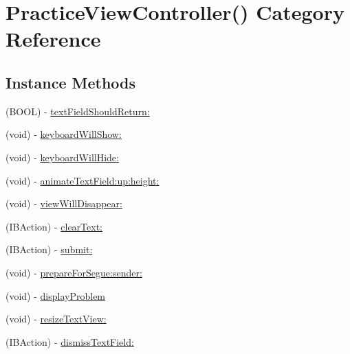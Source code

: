\hypertarget{category_practice_view_controller_07_08}{\section{Practice\-View\-Controller() Category Reference}
\label{category_practice_view_controller_07_08}
}
\subsection*{Instance Methods}
\begin{DoxyCompactItemize}
\item 
(B\-O\-O\-L) -\/ \hyperlink{category_practice_view_controller_07_08_a0b9333f9610af7b5283040c23e63cb1f}{text\-Field\-Should\-Return\-:}
\item 
(void) -\/ \hyperlink{category_practice_view_controller_07_08_a9c7201b0fa35638be3cd9e01b71e4ec6}{keyboard\-Will\-Show\-:}
\item 
(void) -\/ \hyperlink{category_practice_view_controller_07_08_a3a540919bf3c72908db48e95e3bbb04b}{keyboard\-Will\-Hide\-:}
\item 
(void) -\/ \hyperlink{category_practice_view_controller_07_08_ae3a517e1595c3a4caf511c19e4203846}{animate\-Text\-Field\-:up\-:height\-:}
\item 
(void) -\/ \hyperlink{category_practice_view_controller_07_08_aa8b5c53cd38d32df486b216647a65fdb}{view\-Will\-Disappear\-:}
\item 
(I\-B\-Action) -\/ \hyperlink{category_practice_view_controller_07_08_ad7d400bbdc10dc429b5a8149a8c3efac}{clear\-Text\-:}
\item 
(I\-B\-Action) -\/ \hyperlink{category_practice_view_controller_07_08_ab15e2af62b6c81f02f508925acac7b63}{submit\-:}
\item 
(void) -\/ \hyperlink{category_practice_view_controller_07_08_a93c93892fdf2b46feb186784edb9c869}{prepare\-For\-Segue\-:sender\-:}
\item 
(void) -\/ \hyperlink{category_practice_view_controller_07_08_a161c62c0a78e7200e152792f4e527290}{display\-Problem}
\item 
(void) -\/ \hyperlink{category_practice_view_controller_07_08_af00583590d054aed3c04714c2a97265c}{resize\-Text\-View\-:}
\item 
(I\-B\-Action) -\/ \hyperlink{category_practice_view_controller_07_08_ac750976072427f630d9d399900204cc8}{dismiss\-Text\-Field\-:}
\end{DoxyCompactItemize}
